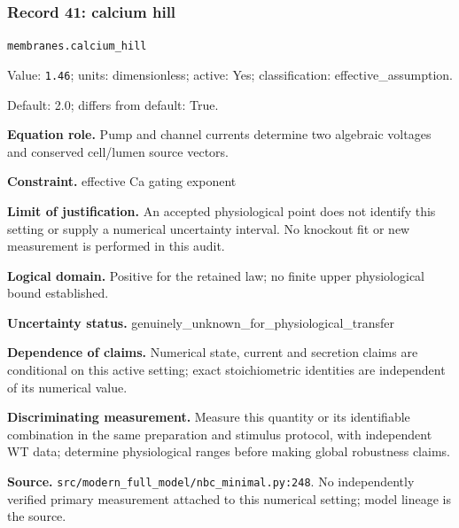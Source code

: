\subsubsection*{Record 41: calcium hill}
{\small \nolinkurl{membranes.calcium_hill}\par

Value: \texttt{1.46}; units: dimensionless; active: Yes; classification: effective\_assumption.\par

Default: 2.0; differs from default: True.\par

\textbf{Equation role.} Pump and channel currents determine two algebraic voltages and conserved cell/lumen source vectors.\par

\textbf{Constraint.} effective Ca gating exponent\par

\textbf{Limit of justification.} An accepted physiological point does not identify this setting or supply a numerical uncertainty interval. No knockout fit or new measurement is performed in this audit.\par

\textbf{Logical domain.} Positive for the retained law; no finite upper physiological bound established.\par

\textbf{Uncertainty status.} genuinely\_unknown\_for\_physiological\_transfer\par

\textbf{Dependence of claims.} Numerical state, current and secretion claims are conditional on this active setting; exact stoichiometric identities are independent of its numerical value.\par

\textbf{Discriminating measurement.} Measure this quantity or its identifiable combination in the same preparation and stimulus protocol, with independent WT data; determine physiological ranges before making global robustness claims.\par

\textbf{Source.} \nolinkurl{src/modern_full_model/nbc_minimal.py:248}. No independently verified primary measurement attached to this numerical setting; model lineage is the source.\par}

